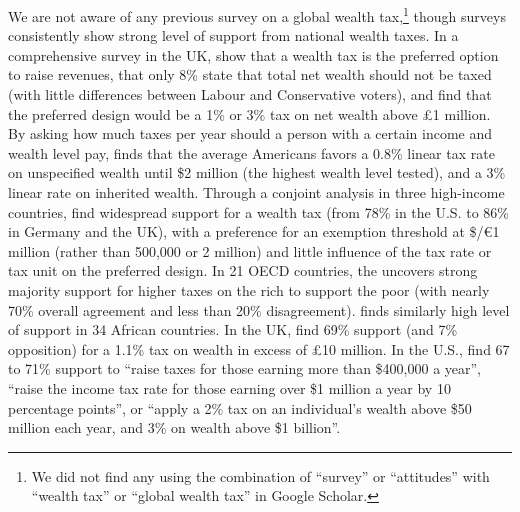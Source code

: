 We are not aware of any previous survey on a global wealth tax,\footnote{We did not find any using the combination of ``survey'' or ``attitudes'' with ``wealth tax'' or ``global wealth tax'' in Google Scholar.} though surveys consistently show strong level of support from national wealth taxes. 
In a comprehensive survey in the UK, \citet{rowlingson_public_2021} show that a wealth tax is the preferred option to raise revenues, that only 8\% state that total net wealth should not be taxed (with little differences between Labour and Conservative voters), and find that the preferred design would be a 1\% or 3\% tax on net wealth above £1 million. 
By asking how much taxes per year should a person with a certain income and wealth level pay, \citet{fisman_americans_2017} finds that the average Americans favors a 0.8\% linear tax rate on unspecified wealth until \$2 million (the highest wealth level tested), and a 3\% linear rate on inherited wealth. %
Through a conjoint analysis in three high-income countries, \citet{schechtl_tax_2023} find widespread support for a wealth tax (from 78\% in the U.S. to 86\% in Germany and the UK), with a preference for an exemption threshold at \$/\euro{}1 million (rather than 500,000 or 2 million) and little influence of the tax rate or tax unit on the preferred design. 
In 21 OECD countries, the \citet{oecd_main_2019} uncovers strong majority support for higher taxes on the rich to support the poor (with nearly 70\% overall agreement and less than 20\% disagreement). \citet{isbell_footing_2022} finds similarly high level of support in 34 African countries. 
In the UK, \citet{patriotic_millionaires_patriotic_2022} find 69\% support (and 7\% opposition) for a 1.1\% tax on wealth in excess of £10 million. 
In the U.S., \citet{americans_for_tax_fairness_support_2021} find 67 to 71\% support to ``raise taxes for those earning more than \$400,000 a year'', ``raise the income tax rate for those earning over \$1 million a year by 10 percentage points'', or ``apply a 2\% tax on an individual's wealth above \$50 million each year, and 3\% on wealth above \$1 billion''.


